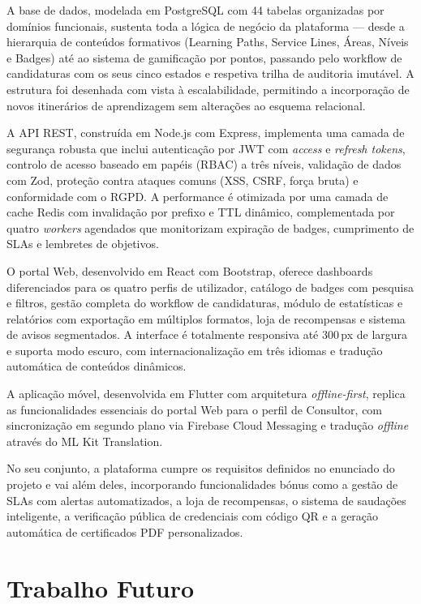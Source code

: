 \documentclass[12pt,a4paper]{report}
\begin{document}
A base de dados, modelada em PostgreSQL com 44 tabelas organizadas por domínios funcionais, sustenta toda a lógica de negócio da plataforma --- desde a hierarquia de conteúdos formativos (Learning Paths, Service Lines, Áreas, Níveis e Badges) até ao sistema de gamificação por pontos, passando pelo workflow de candidaturas com os seus cinco estados e respetiva trilha de auditoria imutável. A estrutura foi desenhada com vista à escalabilidade, permitindo a incorporação de novos itinerários de aprendizagem sem alterações ao esquema relacional.

A API REST, construída em Node.js com Express, implementa uma camada de segurança robusta que inclui autenticação por JWT com \textit{access} e \textit{refresh tokens}, controlo de acesso baseado em papéis (RBAC) a três níveis, validação de dados com Zod, proteção contra ataques comuns (XSS, CSRF, força bruta) e conformidade com o RGPD. A performance é otimizada por uma camada de cache Redis com invalidação por prefixo e TTL dinâmico, complementada por quatro \textit{workers} agendados que monitorizam expiração de badges, cumprimento de SLAs e lembretes de objetivos.

O portal Web, desenvolvido em React com Bootstrap, oferece dashboards diferenciados para os quatro perfis de utilizador, catálogo de badges com pesquisa e filtros, gestão completa do workflow de candidaturas, módulo de estatísticas e relatórios com exportação em múltiplos formatos, loja de recompensas e sistema de avisos segmentados. A interface é totalmente responsiva até 300\,px de largura e suporta modo escuro, com internacionalização em três idiomas e tradução automática de conteúdos dinâmicos.

A aplicação móvel, desenvolvida em Flutter com arquitetura \textit{offline-first}, replica as funcionalidades essenciais do portal Web para o perfil de Consultor, com sincronização em segundo plano via Firebase Cloud Messaging e tradução \textit{offline} através do ML Kit Translation.

No seu conjunto, a plataforma cumpre os requisitos definidos no enunciado do projeto e vai além deles, incorporando funcionalidades bónus como a gestão de SLAs com alertas automatizados, a loja de recompensas, o sistema de saudações inteligente, a verificação pública de credenciais com código QR e a geração automática de certificados PDF personalizados.

\section{Trabalho Futuro}
\end{document}

